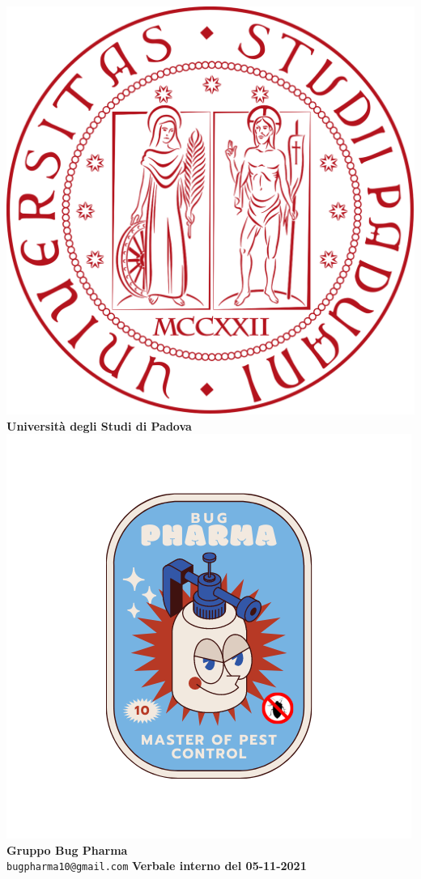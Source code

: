 \documentclass[11pt]{article}
\begin{document}
	\thispagestyle{empty}
	\begin{titlepage}
		\begin{center}
			\includegraphics[scale = 0.05]{../../Res/logo_unipd.png}\\
			\bigskip
			\large \textbf{Università degli Studi di Padova} \\
			\vfill
			\includegraphics[scale = 0.7]{../../Res/BugPharma_Logo.png}\\
			\huge \textbf{Gruppo Bug Pharma} \\
			\vfill
			\large \texttt{bugpharma10@gmail.com}
			\vfill
			\Huge \textbf{Verbale interno del 05-11-2021}\\
			

\end{center}
\end{titlepage}
\end{document}

